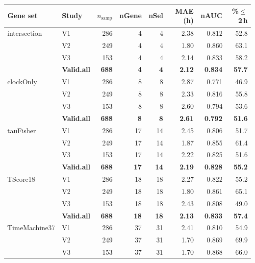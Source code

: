 \documentclass[10pt,a4paper]{article}
\begin{document}
\begin{table}[h]
\centering
\begin{tabular}{llrrrrrr}
\toprule
Gene set & Study & $n_{\mathrm{samp}}$ & nGene & nSel
  & MAE (h) & nAUC & \%$\leq$2\,h \\
\midrule
intersection & V1 & 286 & 4 & 4 & 2.38 & 0.812 & 52.8 \\
             & V2 & 249 & 4 & 4 & 1.80 & 0.860 & 63.1 \\
             & V3 & 153 & 4 & 4 & 2.14 & 0.833 & 58.2 \\
             & \textbf{Valid.all} & \textbf{688} & \textbf{4}
               & \textbf{4} & \textbf{2.12} & \textbf{0.834}
               & \textbf{57.7} \\
\addlinespace
clockOnly    & V1 & 286 & 8 & 8 & 2.87 & 0.771 & 46.9 \\
             & V2 & 249 & 8 & 8 & 2.33 & 0.816 & 55.8 \\
             & V3 & 153 & 8 & 8 & 2.60 & 0.794 & 53.6 \\
             & \textbf{Valid.all} & \textbf{688} & \textbf{8}
               & \textbf{8} & \textbf{2.61} & \textbf{0.792}
               & \textbf{51.6} \\
\addlinespace
tauFisher    & V1 & 286 & 17 & 14 & 2.45 & 0.806 & 51.7 \\
             & V2 & 249 & 17 & 14 & 1.87 & 0.855 & 61.4 \\
             & V3 & 153 & 17 & 14 & 2.22 & 0.825 & 51.6 \\
             & \textbf{Valid.all} & \textbf{688} & \textbf{17}
               & \textbf{14} & \textbf{2.19} & \textbf{0.828}
               & \textbf{55.2} \\
\addlinespace
TScore18     & V1 & 286 & 18 & 18 & 2.27 & 0.822 & 55.2 \\
             & V2 & 249 & 18 & 18 & 1.80 & 0.861 & 65.1 \\
             & V3 & 153 & 18 & 18 & 2.43 & 0.808 & 49.0 \\
             & \textbf{Valid.all} & \textbf{688} & \textbf{18}
               & \textbf{18} & \textbf{2.13} & \textbf{0.833}
               & \textbf{57.4} \\
\addlinespace
TimeMachine37 & V1 & 286 & 37 & 31 & 2.41 & 0.810 & 54.9 \\
              & V2 & 249 & 37 & 31 & 1.70 & 0.869 & 69.9 \\
              & V3 & 153 & 37 & 31 & 1.70 & 0.868 & 66.0 \\

\end{tabular}
\end{table}
\end{document}
